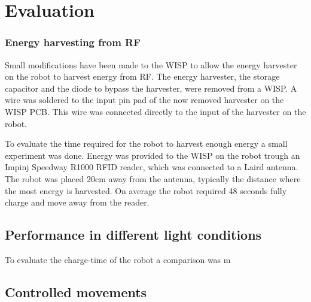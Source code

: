 \chapter{Evaluation} 


\subsection{Energy harvesting from RF}
Small modifications have been made to the WISP to allow the energy harvester on the robot to harvest energy from RF.
The energy harvester, the storage capacitor and the diode to bypass the harvester, were removed from a WISP.
A wire was soldered to the input pin pad of the now removed harvester on the WISP PCB.
This wire was connected directly to the input of the harvester on the robot.

To evaluate the time required for the robot to harvest enough energy a small experiment was done.
Energy was provided to the WISP on the robot trough an Impinj Speedway R1000 RFID reader, which was connected to a Laird antenna.
The robot was placed 20cm away from the antenna, typically the distance where the most energy is harvested.
On average the robot required 48 seconds fully charge and move away from the reader.

\section{Performance in different light conditions}


To evaluate the charge-time of the robot a comparison was m




\section{Controlled movements}





